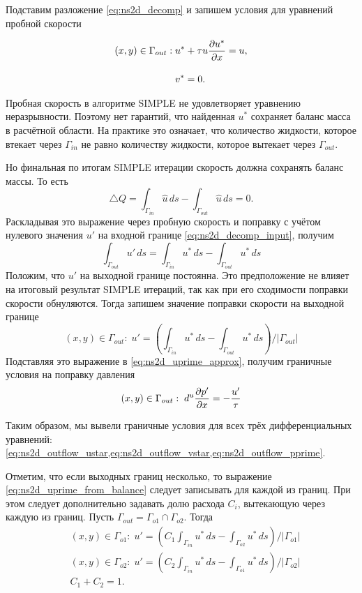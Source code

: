 Подставим разложение \cref{eq:ns2d_decomp} и запишем условия для уравнений пробной скорости

\begin{align}
\label{eq:ns2d_outflow_ustar}
(x,y)\in\Gamma_{out}:\; &u^* + \tau u\frac{\partial u^*}{\partial x} = u,\\[10pt]
\label{eq:ns2d_outflow_vstar}
                        &v^* = 0.
\end{align}

Пробная скорость в алгоритме SIMPLE не удовлетворяет уравнению неразрывности.
Поэтому нет гарантий, что найденная $u^*$ сохраняет баланс масса в расчётной области.
На практике это означает, что количество жидкости, которое втекает через $\Gamma_{in}$ не равно
количеству жидкости, которое вытекает через $\Gamma_{out}$.

Но финальная по итогам SIMPLE итерации скорость должна сохранять баланс массы.
То есть
$$
\triangle Q = \int_{\Gamma_{in}} \hat u \, ds - \int_{\Gamma_{out}} \hat u \, ds = 0.
$$
Раскладывая это выражение через пробную скорость и поправку с учётом нулевого значения $u'$ на входной границе \cref{eq:ns2d_decomp_input},
получим
$$
\int_{\Gamma_{out}} u' \, ds = \int_{\Gamma_{in}} u^* \, ds - \int_{\Gamma_{out}} u^* \, ds
$$
Положим, что $u'$ на выходной границе постоянна.
Это предположение не влияет на итоговый результат SIMPLE итераций, так как
при его сходимости поправки скорости обнуляются. Тогда запишем значение поправки скорости
на выходной границе
\begin{equation}
\label{eq:ns2d_uprime_from_balance}
(x,y)\in\Gamma_{out}:\; u' = \left(\int_{\Gamma_{in}} u^* \, ds - \int_{\Gamma_{out}} u^* \, ds \right) / \left|\Gamma_{out}\right|
\end{equation}
Подставляя это выражение в \cref{eq:ns2d_uprime_approx}, получим граничные условия на поправку давления
\begin{equation}
\label{eq:ns2d_outflow_pprime}
(x,y)\in\Gamma_{out}:\;  d^u\frac{\partial p'}{\partial x} = -\frac{u'}{\tau}
\end{equation}

Таким образом, мы вывели граничные условия для всех трёх дифференциальных уравнений:
\cref{eq:ns2d_outflow_ustar,eq:ns2d_outflow_vstar,eq:ns2d_outflow_pprime}.

Отметим, что если выходных границ несколько, то выражение \cref{eq:ns2d_uprime_from_balance}
следует записывать для каждой из границ. При этом следует дополнительно задавать
долю расхода $C_i$, вытекающую через каждую из границ. Пусть $\Gamma_{out} = \Gamma_{o1} \cap \Gamma_{o2}$.
Тогда
\begin{align*}
&(x,y)\in\Gamma_{o1}:\; u' = \left(C_1 \int_{\Gamma_{in}} u^* \, ds - \int_{\Gamma_{o2}} u^* \, ds \right) / \left|\Gamma_{o1}\right|\\
&(x,y)\in\Gamma_{o2}:\; u' = \left(C_2 \int_{\Gamma_{in}} u^* \, ds - \int_{\Gamma_{o1}} u^* \, ds \right) / \left|\Gamma_{o2}\right|\\
&C_1 + C_2 = 1.
\end{align*}

